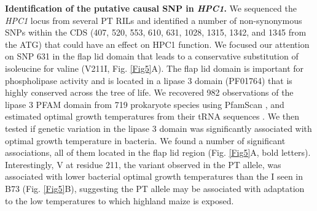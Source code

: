 \documentclass[9pt,twocolumn,twoside,lineno]{BioRxiv}
\begin{document}
\textbf{Identification of the putative causal SNP in \textit{HPC1}.} We sequenced the \textit{HPC1} locus from several PT RILs and identified a number of non-synonymous SNPs within the CDS (407, 520, 553, 610, 631, 1028, 1315, 1342, and 1345 from the ATG) that could have an effect on HPC1 function.
We focused our attention on SNP 631 in the flap lid domain that leads to a conservative substitution of isoleucine for valine (V211I, Fig. \ref{Fig5}A).  
The flap lid domain is important for phospholipase activity and is located in a lipase 3 domain (PF01764) that is highly conserved across the tree of life. 
We recovered 982 observations of the lipase 3 PFAM domain from 719 prokaryote species using PfamScan \cite{Potter2018-tk, El-Gebali2019-pw}, and estimated optimal growth temperatures from their tRNA sequences \cite{Cimen2020-dm}.
We then tested if genetic variation in the lipase 3 domain was significantly associated with optimal growth temperature in bacteria. 
We found a number of significant associations, all of them located in the flap lid region (Fig. \ref{Fig5}A, bold letters).  
Interestingly, V at residue 211, the variant observed in the PT allele, was associated with lower bacterial optimal growth temperatures than the I seen in B73 (Fig. \ref{Fig5}B), suggesting the PT allele may be associated with adaptation to the low temperatures to which highland maize is exposed.
\end{document}
